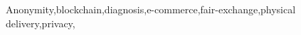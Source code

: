 \documentclass[preprint,3p]{elsarticle}
\begin{document}
\begin{frontmatter}

\title{\TITLE}






\begin{abstract}
\ABSTRACT{}
\end{abstract}

\begin{keyword}
Anonymity\sep blockchain\sep diagnosis\sep e-commerce\sep fair-exchange\sep physical delivery\sep privacy\sep 
\end{keyword}

\end{frontmatter}

\def\JOURNALIEEE{IEEE}
\def\JOURNALELS{ELS}

\def\JOURNAL{\JOURNALELS}
\newcommand{\printbibliography}{


}



\end{document}
